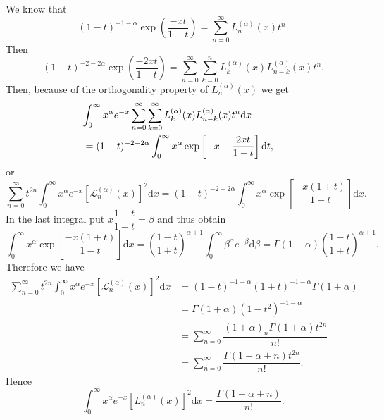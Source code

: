 \begin{solution}
We know that
$$(1-t)^{-1 - \alpha} \exp \left( \dfrac{-xt}{1-t} \right) = \displaystyle\sum_{n=0}^{\infty} L_n^{(\alpha)}(x) t^n.$$
Then
$$(1-t)^{-2-2\alpha} \exp \left( \dfrac{-2xt}{1-t} \right) = \displaystyle\sum_{n=0}^{\infty} \displaystyle\sum_{k=0}^n L_k^{(\alpha)}(x) L_{n-k}^{(\alpha)}(x) t^n.$$
Then, because of the orthogonality property of $L_n^{(\alpha)}(x)$ we get
\begin{eqnarray*}
\lefteqn{\displaystyle\int_0^{\infty} x^{\alpha} e^{-x} \displaystyle\sum_{n=0}^{\infty} \displaystyle\sum_{k=0}^{\infty} L_k^{(\alpha)}(x) L_{n-k}^{(\alpha)}(x) t^n \mathrm{d}x} \\
& = (1-t)^{-2-2 \alpha} \displaystyle\int_0^{\infty} x^{\alpha} \exp \left[ -x - \dfrac{2xt}{1-t} \right] \mathrm{d}t,
\end{eqnarray*}
or
$$\displaystyle\sum_{n=0}^{\infty} t^{2n}\displaystyle\int_0^{\infty} x^{\alpha} e^{-x} \left[ \mathscr{L}_n^{(\alpha)}(x) \right]^2 \mathrm{d}x  = (1-t)^{-2-2\alpha} \displaystyle\int_0^{\infty} x^{\alpha} \exp \left[ \dfrac{-x(1+t)}{1-t} \right] \mathrm{d}x.$$
In the last integral put $x \dfrac{1+t}{1-t} = \beta$ and thus obtain
$$\displaystyle\int_0^{\infty} x^{\alpha} \exp \left[ \dfrac{-x(1+t)}{1-t} \right] \mathrm{d}x = \left( \dfrac{1-t}{1+t} \right)^{\alpha+1} \displaystyle\int_0^{\infty} \beta^{\alpha} e^{-\beta} \mathrm{d} \beta = \Gamma(1+\alpha) \left( \dfrac{1-t}{1+t} \right)^{\alpha+1}.$$
Therefore we have
$$\begin{array}{ll}
\displaystyle\sum_{n=0}^{\infty} t^{2n}\displaystyle\int_0^{\infty} x^{\alpha} e^{-x} \left[ \mathscr{L}_n^{(\alpha)}(x) \right]^2 \mathrm{d}x &= (1-t)^{-1-\alpha} (1+t)^{-1-\alpha} \Gamma(1+\alpha) \\
&= \Gamma(1+\alpha) (1-t^2)^{-1-\alpha} \\
&= \displaystyle\sum_{n=0}^{\infty} \dfrac{(1+\alpha)_n \Gamma(1+\alpha) t^{2n}}{n!} \\
&= \displaystyle\sum_{n=0}^{\infty} \dfrac{\Gamma(1+\alpha+n) t^{2n}}{n!}.
\end{array}$$
Hence
$$\displaystyle\int_0^{\infty} x^{\alpha} e^{-x} \left[ L_n^{(\alpha)}(x) \right]^2 \mathrm{d}x = \dfrac{\Gamma(1+\alpha+n)}{n!}.$$
\end{solution}